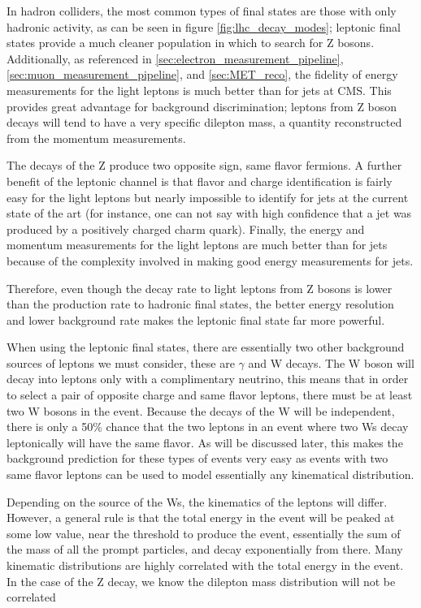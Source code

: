       In hadron colliders, the most common types of final states are those with only hadronic activity, as can be seen in figure \ref{fig:lhc_decay_modes}; leptonic final states provide a much cleaner population in which to search for Z bosons. Additionally, as referenced in \ref{sec:electron_measurement_pipeline}, \ref{sec:muon_measurement_pipeline}, and \ref{sec:MET_reco}, the fidelity of energy measurements for the light leptons is much better than for jets at CMS. This provides great advantage for background discrimination; leptons from Z boson decays will tend to have a very specific dilepton mass, a quantity reconstructed from the momentum measurements.

      The decays of the Z produce two opposite sign, same flavor fermions. A further benefit of the leptonic channel is that flavor and charge identification is fairly easy for the light leptons but nearly impossible to identify for jets at the current state of the art (for instance, one can not say with high confidence that a jet was produced by a positively charged charm quark). Finally, the energy and momentum measurements for the light leptons are much better than for jets because of the complexity involved in making good energy measurements for jets.  

      Therefore, even though the decay rate to light leptons from Z bosons is lower than the production rate to hadronic final states, the better energy resolution and lower background rate makes the leptonic final state far more powerful.

      When using the leptonic final states, there are essentially two other background sources of leptons we must consider, these are $\gamma$ and W decays. The W boson will decay into leptons only with a complimentary neutrino, this means that in order to select a pair of opposite charge and same flavor leptons, there must be at least two W bosons in the event. Because the decays of the W will be independent, there is only a 50\% chance that the two leptons in an event where two Ws decay leptonically will have the same flavor. As will be discussed later, this makes the background prediction for these types of events very easy as events with two same flavor leptons can be used to model essentially any kinematical distribution.

      Depending on the source of the Ws, the kinematics of the leptons will differ. However, a general rule is that the total energy in the event will be peaked at some low value, near the threshold to produce the event, essentially the sum of the mass of all the prompt particles, and decay exponentially from there. Many kinematic distributions are highly correlated with the total energy in the event. In the case of the Z decay, we know the dilepton mass distribution will not be correlated

